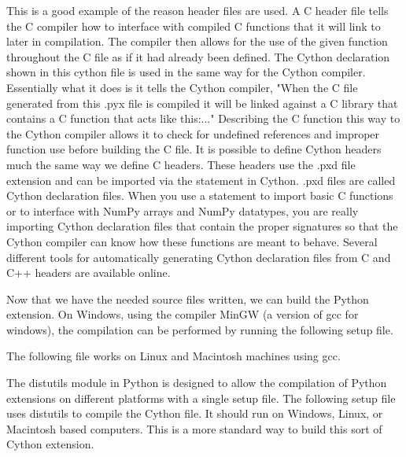 \begin{info}
This is a good example of the reason header files are used.
A C header file tells the C compiler how to interface with compiled C functions that it will link to later in compilation.
The compiler then allows for the use of the given function throughout the C file as if it had already been defined.
The Cython  declaration shown in this cython file is used in the same way for the Cython compiler.
Essentially what it does is it tells the Cython compiler, "When the C file generated from this .pyx file is compiled it will be linked against a C library that contains a C function that acts like this:..."
Describing the C function this way to the Cython compiler allows it to check for undefined references and improper function use before building the C file.
It is possible to define Cython headers much the same way we define C headers.
These headers use the .pxd file extension and can be imported via the  statement in Cython.
.pxd files are called Cython declaration files.
When you use a  statement to import basic C functions or to interface with NumPy arrays and NumPy datatypes, you are really importing Cython declaration files that contain the proper signatures so that the Cython compiler can know how these functions are meant to behave.
Several different tools for automatically generating Cython declaration files from C and C++ headers are available online.
\end{info}

Now that we have the needed source files written, we can build the Python extension.
On Windows, using the compiler MinGW (a version of gcc for windows), the compilation can be performed by running the following setup file.



The following file works on Linux and Macintosh machines using gcc.



The distutils module in Python is designed to allow the compilation of Python extensions on different platforms with a single setup file.
The following setup file uses distutils to compile the Cython file.
It should run on Windows, Linux, or Macintosh based computers.
This is a more standard way to build this sort of Cython extension.

